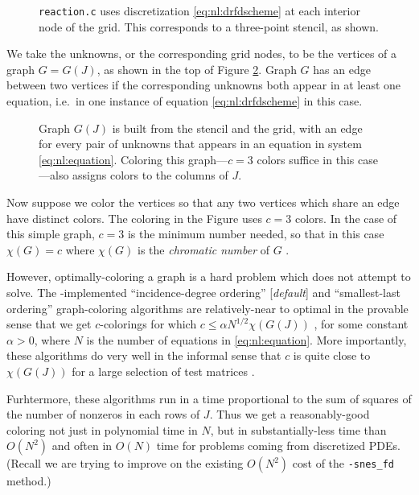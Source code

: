\begin{figure}

\caption{\texttt{reaction.c} uses discretization \eqref{eq:nl:drfdscheme} at each interior node of the grid.  This corresponds to a three-point stencil, as shown.}
\label{fig:stencilreaction}
\end{figure}

We take the unknowns, or the corresponding grid nodes, to be the vertices of a graph $G=G(J)$, as shown in the top of Figure \ref{fig:fdcolorreaction}.  Graph $G$ has an edge between two vertices if the corresponding unknowns both appear in at least one equation, i.e.~in one instance of equation \eqref{eq:nl:drfdscheme} in this case.

\begin{figure}

\caption{Graph $G(J)$ is built from the stencil and the grid, with an edge for every pair of unknowns that appears in an equation in system \eqref{eq:nl:equation}.  Coloring this graph---$c=3$ colors suffice in this case---also assigns colors to the columns of $J$.}
\label{fig:fdcolorreaction}
\end{figure}

Now suppose we color the vertices so that any two vertices which share an edge have distinct colors.  The coloring in the Figure uses $c=3$ colors.  In the case of this simple graph, $c=3$ is the minimum number needed, so that in this case $\chi(G)=c$ where $\chi(G)$ is the \emph{chromatic number} of $G$ \citep{ChartrandLesniakZhang2011}.

However, optimally-coloring a graph is a hard problem which \PETSc does not attempt to solve.  The \PETSc-implemented ``incidence-degree ordering'' [\emph{default}] and ``smallest-last ordering'' graph-coloring algorithms are relatively-near to optimal in the provable sense that we get $c$-colorings for which $c \le \alpha N^{1/2} \chi(G(J))$ \citep{ColemanMore1983}, for some constant $\alpha>0$, where $N$ is the number of equations in \eqref{eq:nl:equation}.  More importantly, these algorithms do very well in the informal sense that $c$ is quite close to $\chi(G(J))$ for a large selection of test matrices \citep{ColemanMore1983}.

Furhtermore, these algorithms run in a time proportional to the sum of squares of the number of nonzeros in each rows of $J$.  Thus we get a reasonably-good coloring not just in polynomial time in $N$, but in substantially-less time than $O(N^2)$ and often in $O(N)$ time for problems coming from discretized PDEs.  (Recall we are trying to improve on the existing $O(N^2)$ cost of the \texttt{-snes\_fd} method.)

